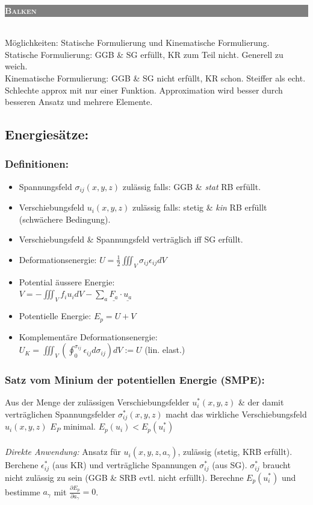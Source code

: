 \documentclass[a4paper,10pt]{article}
\newcommand{\uone}[2]{\colorbox{gray}{\textcolor{white}{\parbox{\linewidth-2.4}{\scshape{\medium\textbf{#1}} }}}\\}
\begin{document}
\begin{multicols}{3}
\uone{Balken}
    2 Möglichkeiten: Statische Formulierung und Kinematische Formulierung.\\
    Statische Formulierung: GGB \& SG erfüllt, KR zum Teil nicht. Generell zu weich.\\
    Kinematische Formulierung: GGB \& SG nicht erfüllt, KR schon. Steiffer als echt. Schlechte approx mit nur einer Funktion. Approximation wird besser durch besseren Ansatz und mehrere Elemente.
    \subsection{Energiesätze:}
        \subsubsection{Definitionen:}
            \begin{itemize}
                \item Spannungsfeld $\sigma_{ij}(x,y,z)$ zulässig falls: GGB \& \textit{stat} RB erfüllt.
                \item Verschiebungsfeld $u_i(x,y,z)$ zulässig falls: stetig \& \textit{kin} RB erfüllt (schwächere Bedingung).
                \item Verschiebungsfeld \& Spannungsfeld verträglich iff SG erfüllt.
                \item Deformationsenergie: $\displaystyle U=\frac{1}{2}\iiint_V \sigma_{ij}\epsilon_{ij}dV$
                \item Potential äussere Energie:\\
                $\displaystyle V=-\iiint_V f_iu_idV-\sum_{a}\underline{F_a}\cdot\underline{u_a}$ 
                \item Potentielle Energie: $E_p=U+V$
                \item Komplementäre Deformationsenergie:\\ $U_K=\iiint_V(\oint_0^{\sigma_{ij}}\epsilon_{ij}d\sigma_{ij})dV := U$  (lin. elast.)
            \end{itemize}
        \subsubsection{Satz vom Minium der potentiellen Energie (SMPE):}
            Aus der Menge der zulässigen Verschiebungsfelder $u_i^*(x,y,z)$ \& der damit verträglichen Spannungsfelder $\sigma_{ij}^*(x,y,z)$ macht das wirkliche Verschiebungsfeld $u_i(x,y,z)$ $E_P$ minimal. $E_p(u_i) < E_p(u_i^*)$\\\\
            \textit{Direkte Anwendung:} Ansatz für $u_i(x,y,z,a_\gamma)$, zulässig (stetig, KRB erfüllt). Berchene $\epsilon_{ij}^*$ (aus KR) und verträgliche Spannungen $\sigma_{ij}^*$ (aus SG). $\sigma_{ij}^*$ braucht nicht zulässig zu sein (GGB \& SRB evtl. nicht erfüllt). Berechne $E_p(u_i^*)$ und bestimme $a_\gamma$ mit $\frac{\partial E_p}{\partial a_\gamma}=0$.

\end{multicols}
\end{document}
